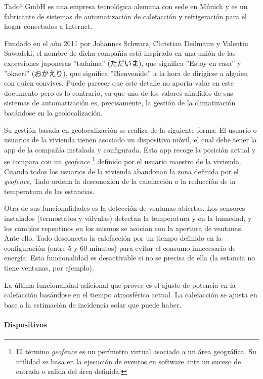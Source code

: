 \documentclass[spanish,12pt, a4paper, twoside]{paper}
\begin{document}
Tadoº GmbH es una empresa tecnológica alemana con sede en Múnich y es un fabricante de sistemas de automatización de calefacción y refrigeración para el hogar conectados a Internet.
\newline

Fundado en el año 2011 por Johannes Schwarz, Christian Deilmann y Valentin Sawadski, el nombre de dicha compañía está inspirado en una unión de las expresiones japonesas ''tadaima'' (ただいま), que significa ''Estoy en casa'' y ''okaeri'' (おかえり), que significa ''Bienvenido'' a la hora de dirigirse a alguien con quien convives. 
Puede parecer que este detalle no aporta valor en este documento pero es lo contrario, ya que uno de los valores añadidos de sus sistemas de automatización es, precisamente, la gestión de la climatización basándose en la geolocalización.
\newline

Su gestión basada en geolocalización se realiza de la siguiente forma: El usuario o usuarios de la vivienda tienen asociado un dispositivo móvil, el cual debe tener la app de la compañía instalada y configurada. Esta app recoge la posición actual y se compara con un \emph{geofence} \footnote{El término \emph{geofence} es un perímetro virtual asociado a un área geográfica. Su utilidad se basa en la ejecución de eventos en software ante un suceso de entrada o salida del área definida. } definido por el usuario maestro de la vivienda. Cuando todos los usuarios de la vivienda abandonan la zona definida por el \emph{geofence}, Tado ordena la desconexión de la calefacción o la reducción de la temperatura de las estancias.
\newline

Otra de sus funcionalidades es la detección de ventanas abiertas. Los sensores instalados (termostatos y válvulas) detectan la temperatura y en la humedad, y los cambios repentinos en los mismos se asocian con la apertura de ventanas. Ante ello, Tado desconecta la calefacción por un tiempo definido en la configuración (entre 5 y 60 minutos) para evitar el consumo innecesario de energía. Esta funcionalidad es desactivable si no se precisa de ella (la estancia no tiene ventanas, por ejemplo).
\newline

La última funcionalidad adicional que provee es el ajuste de potencia en la calefacción basándose en el tiempo atmosférico actual. La calefacción se ajusta en base a la estimación de incidencia solar que puede haber.

\paragraph{Dispositivos}
\end{document}
